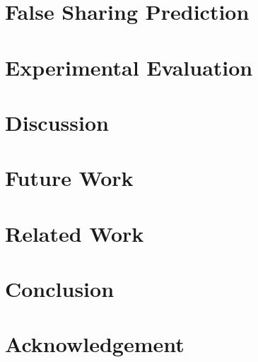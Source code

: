 \documentclass[9pt]{sigplanconf}
\begin{document}
\section{False Sharing Prediction}

%

\section{Experimental Evaluation}


\section{Discussion}


\section{Future Work}


%
\section{Related Work}


\section{Conclusion}


\section{Acknowledgement}









%

{


}

\end{document}
